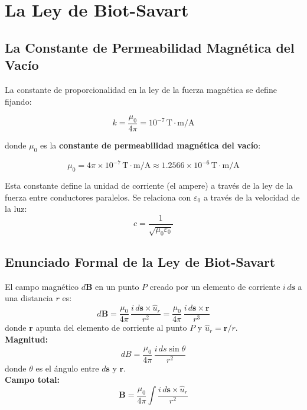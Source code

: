 \documentclass[12pt, letterpaper]{report}
\numberwithin{equation}{section}
\newcommand{\vB}[1]{\boldsymbol{#1}}          %
\newcommand{\un}[1]{\,\mathrm{#1}}            %
\begin{document}
\section{La Ley de Biot-Savart}

\subsection{La Constante de Permeabilidad Magnética del Vacío}

La constante de proporcionalidad en la ley de la fuerza magnética se
define fijando:

\begin{equation}
  k = \frac{\mu_0}{4\pi} = 10^{-7}\un{T\cdot m/A}
\end{equation}

donde $\mu_0$ es la \textbf{constante de permeabilidad magnética del vacío}:

\begin{equation}
  \boxed{\mu_0 = 4\pi\times10^{-7}\un{T\cdot m/A}
        \approx 1.2566\times10^{-6}\un{T\cdot m/A}}
  \label{eq:mu0}
\end{equation}

Esta constante define la unidad de corriente (el ampere) a través de la ley
de la fuerza entre conductores paralelos. Se relaciona con $\varepsilon_0$
a través de la velocidad de la luz:
\[
  c = \frac{1}{\sqrt{\mu_0\varepsilon_0}}
\]

\subsection{Enunciado Formal de la Ley de Biot-Savart}

\begin{tcolorbox}[defbox, title=Ley de Biot-Savart]
  El campo magnético $d\vB{B}$ en un punto $P$ creado por un elemento de
  corriente $i\,d\vB{s}$ a una distancia $r$ es:
  \begin{equation}
    \boxed{d\vB{B} = \frac{\mu_0}{4\pi}\,
      \frac{i\,d\vB{s}\times\hat{u}_r}{r^2}
      = \frac{\mu_0}{4\pi}\,
      \frac{i\,d\vB{s}\times\vB{r}}{r^3}}
    \label{eq:BiotSavart}
  \end{equation}
  donde $\vB{r}$ apunta del elemento de corriente al punto $P$ y
  $\hat{u}_r=\vB{r}/r$.\\[5pt]
  \textbf{Magnitud:}
  \begin{equation}
    dB = \frac{\mu_0}{4\pi}\,\frac{i\,ds\sin\theta}{r^2}
    \label{eq:BSmag}
  \end{equation}
  donde $\theta$ es el ángulo entre $d\vB{s}$ y $\vB{r}$.\\[5pt]
  \textbf{Campo total:}
  \begin{equation}
    \vB{B} = \frac{\mu_0}{4\pi}\int\frac{i\,d\vB{s}\times\hat{u}_r}{r^2}
    \label{eq:BSintegral}
  \end{equation}
\end{tcolorbox}
\end{document}

